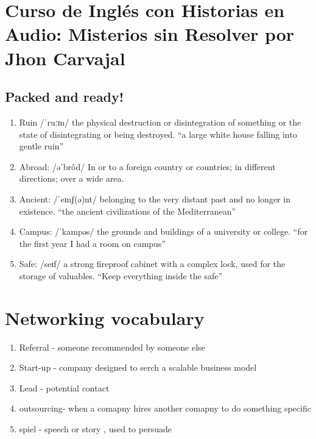 \documentclass{article}
\begin{document}
    \section{Curso de Inglés con Historias en Audio: Misterios sin Resolver por Jhon Carvajal}
    \subsection{Packed and ready!}
    \begin{enumerate}
        \item Ruin /ˈruːɪn/ the physical destruction or disintegration of something or the state of disintegrating or being destroyed.
        “a large white house falling into gentle ruin”
        \item Abroad: /əˈbrôd/ In or to a foreign country or countries; in different directions; over a wide area.
        \item Ancient: /ˈeɪnʃ(ə)nt/ belonging to the very distant past and no longer in existence.
        “the ancient civilizations of the Mediterranean”
        \item Campus: /ˈkampəs/ the grounds and buildings of a university or college.
        “for the first year I had a room on campus”
        \item Safe: /seɪf/ a strong fireproof cabinet with a complex lock, used for the storage of valuables. “Keep everything inside the safe”
    \end{enumerate}
    \section{Networking vocabulary}
    \begin{enumerate}
        \item Referral - someone recommended by someone else
        \item Start-up - company designed to serch a scalable business model
        \item Lead - potential contact 
        \item outsourcing- when a comapny hires another comapny to do something specific
        \item spiel - speech or story , used to persuade 
    \end{enumerate}
\end{document}
